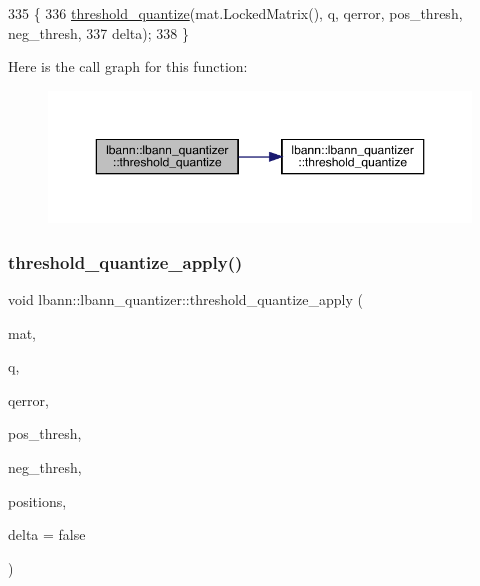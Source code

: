 \begin{DoxyCode}
335                                    \{
336   \hyperlink{classlbann_1_1lbann__quantizer_a00106e69ea8a6dfe9e9a91c75b845bcd}{threshold\_quantize}(mat.LockedMatrix(), q, qerror, pos\_thresh, neg\_thresh,
337                      delta);
338 \}
\end{DoxyCode}
Here is the call graph for this function\+:\nopagebreak
\begin{figure}[H]
\begin{center}
\leavevmode
\includegraphics[width=350pt]{classlbann_1_1lbann__quantizer_ae9949af6bec1e95adf5a32ba9bb4afd8_cgraph}
\end{center}
\end{figure}
\mbox{\label{classlbann_1_1lbann__quantizer_a2bcdf31781bf72bbe63940ea0d92990f}} 
\subsubsection{\texorpdfstring{threshold\+\_\+quantize\+\_\+apply()}{threshold\_quantize\_apply()}}
{\footnotesize\ttfamily void lbann\+::lbann\+\_\+quantizer\+::threshold\+\_\+quantize\+\_\+apply (\begin{DoxyParamCaption}\item[{const \hyperlink{base_8hpp_a68f11fdc31b62516cb310831bbe54d73}{Mat} \&}]{mat,  }\item[{\hyperlink{classlbann_1_1lbann__quantizer_a85ea8e298c2975b4f802855278406aa7}{Thresh\+Quantized} \&}]{q,  }\item[{\hyperlink{base_8hpp_a68f11fdc31b62516cb310831bbe54d73}{Mat} \&}]{qerror,  }\item[{Data\+Type}]{pos\+\_\+thresh,  }\item[{Data\+Type}]{neg\+\_\+thresh,  }\item[{std\+::vector$<$ El\+::\+Unsigned $>$ \&}]{positions,  }\item[{bool}]{delta = {\ttfamily false} }\end{DoxyParamCaption})\hspace{0.3cm}{\ttfamily [private]}}

